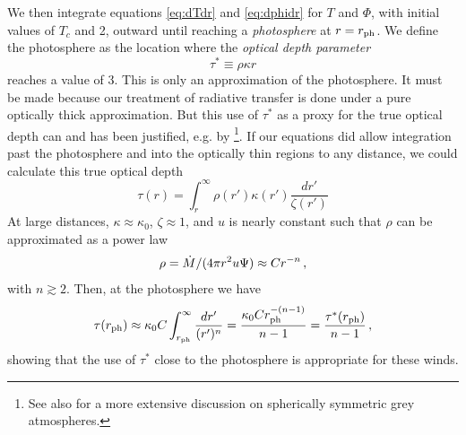 \documentclass[../main.tex]{subfiles}
\begin{document}
We then integrate equations \eqref{eq:dTdr} and \eqref{eq:dphidr} for $T$ and $\Phi$, with initial values of $T_c$ and 2, outward until reaching a \textit{photosphere} at $r=r_\text{ph}$. We define the photosphere as the location where the \textit{optical depth parameter}
\begin{equation}\label{eq:taustar}
    \tau^*\equiv \rho\kappa r
\end{equation}
reaches a value of 3. This is only an approximation of the photosphere. It must be made because our treatment of radiative transfer is done under a pure optically thick approximation. But this use of $\tau^*$ as a proxy for the true optical depth can and has been justified, e.g. by \citet{Quinn1985}\footnote{See also \citet[Chapter~7.6]{Mihalas1978} for a more extensive discussion on spherically symmetric grey atmospheres.}. If our equations did allow integration past the photosphere and into the optically thin regions to any distance, we could calculate this true optical depth
\begin{equation}\label{eq:trueopticaldepth}
    \tau(r)=\int_r^\infty \rho(r')\kappa(r') \frac{dr'}{\zeta(r')}
\end{equation}
At large distances, $\kappa\approx \kappa_0$, $\zeta\approx 1$, and $u$ is nearly constant such that $\rho$ can be approximated as a power law
\begin{equation}
    \rho = \dot{M}/(4\pi r^2 u\Psi) \approx  Cr^{-n}\,,
\end{equation}
with $n\gtrsim 2$. Then, at the photosphere we have
\begin{equation}\label{eq:tau_taustar_approx}
    \tau(r_\text{ph})\approx\kappa_0C\int_{r_\text{ph}}^\infty \frac{dr'}{(r')^n}=\frac{\kappa_0 Cr_\text{ph}^{-(n-1)}}{n-1}=\frac{\tau^*(r_\text{ph})}{n-1}\,,
\end{equation}
showing that the use of $\tau^*$ close to the photosphere is appropriate for these winds.  
\end{document}
